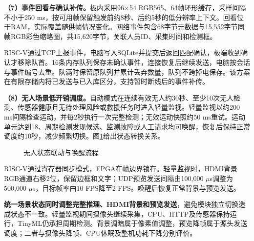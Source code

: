 \documentclass[UTF8,a4paper,zihao=-4,fontset=none,scheme=plain]{ctexart}
\begin{document}
\textbf{（7）事件回看与确认补传。}板内采用96×54 RGB565、64帧环形缓存，采样间隔不小于250 ms，按可用帧保留触发前约8秒、后约5秒的低分辨率上下文。回看位于RAM，实际覆盖随供帧情况变化。网络事件包含68字节元数据与15,552字节同帧RGB彩色缩略图，共15,620字节，关联人员ID、采集时间和检测框。

RISC-V通过TCP上报事件，电脑写入SQLite并提交后返回匹配确认，板端收到确认才移除队首。16条内存队列保存未确认事件，连接恢复后继续发送，电脑按会话与事件编号去重。队满时保留原队列并累计丢弃数量，队列不跨掉电保存。该方案在有限存储内将已发送与已入库区分，支持暂时断线后的事件补传。

\textbf{（8）无人场景低开销调度。}自动模式在连续有效无人约30秒、至少10次无人检测、传感器健康且无待处理风险或救援任务时进入轻量监视。轻量监视以约200 ms间隔检查运动，并每2秒执行一次完整检测；无效运动快照约50 ms重试。运动单元达到18、周期检测发现候选、监测故障或人工请求均可唤醒，恢复后保持正常调度约10秒，减少频繁切换。图\ref{fig:power}给出状态转换关系。

\begin{figure}[H]
 \centering
 \caption{无人状态联动与唤醒流程}\label{fig:power}
\end{figure}

RISC-V通过寄存器同步模式，FPGA在帧边界锁存。轻量监视时，HDMI背景RGB通道右移2位，保留边框和文字；UDP预览发送间隔由100,000 $\mu$s调整为500,000 $\mu$s，目标帧率由10 FPS降至2 FPS。唤醒后恢复正常背景与预览发送。

\textbf{统一场景状态同时调整完整推理、HDMI背景和预览发送}，避免模块独立切换造成状态不一致。轻量监视期间摄像头继续采集，CPU、HTTP及传感器保持运行，TinyML仍承担周期检测。背景调暗属于像素值调整，预览降帧属于源头发送调度；二者与摄像头降帧、CPU休眠及整机功耗下降分别评价。
\end{document}
